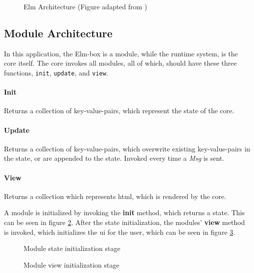 \begin{figure}
  \centering
  
  \caption{Elm Architecture (Figure adapted from \cite{elmFig})}
  \label{fig:elmArchitecture}
\end{figure}

\subsection{Module Architecture}

In this application, the Elm-box is a module, while the runtime system, is the
core itself. The core invokes all modules, all of which, should have these three
functions, \lstinline{init}, \lstinline{update}, and \lstinline{view}.

\paragraph{Init} Returns a collection of key-value-pairs, which represent
the state of the core.

\paragraph{Update} Returns a collection of key-value-pairs, which
overwrite existing key-value-pairs in the state, or are appended to the state.
Invoked every time a \textit{Msg} is sent.

\paragraph{View} Returns a collection which represents \gls{html},
which is rendered by the core.

A module is initialized by invoking the \textbf{init} method, which returns a
state. This can be seen in figure \ref{fig:moduleInit}. After the state
initialization, the modules' \textbf{view} method is invoked, which initializes
the \gls{ui} for the user, which can be seen in figure \ref{fig:moduleInitView}.

\begin{figure}
  \centering
  
  \caption{Module state initialization stage}
  \label{fig:moduleInit}
\end{figure}

\begin{figure}
  \centering
  
  \caption{Module view initialization stage}
  \label{fig:moduleInitView}
\end{figure}

